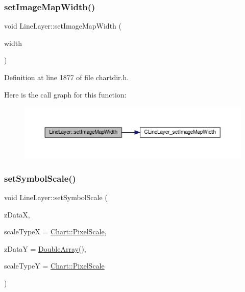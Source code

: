 \subsubsection{\texorpdfstring{set\+Image\+Map\+Width()}{setImageMapWidth()}}
{\footnotesize\ttfamily void Line\+Layer\+::set\+Image\+Map\+Width (\begin{DoxyParamCaption}\item[{int}]{width }\end{DoxyParamCaption})\hspace{0.3cm}{\ttfamily [inline]}}



Definition at line 1877 of file chartdir.\+h.

Here is the call graph for this function\+:
\nopagebreak
\begin{figure}[H]
\begin{center}
\leavevmode
\includegraphics[width=350pt]{class_line_layer_a64657daacc236f5f74b9f91edf70a6bd_cgraph}
\end{center}
\end{figure}
\mbox{\label{class_line_layer_a895f509de10c66189649d10872db77ab}} 
\subsubsection{\texorpdfstring{set\+Symbol\+Scale()}{setSymbolScale()}}
{\footnotesize\ttfamily void Line\+Layer\+::set\+Symbol\+Scale (\begin{DoxyParamCaption}\item[{\hyperlink{class_double_array}{Double\+Array}}]{z\+DataX,  }\item[{int}]{scale\+TypeX = {\ttfamily \hyperlink{namespace_chart_af8005281e1fb57d737e9f89b13605808afebebf69a28e58958dc5f9da3ece2147}{Chart\+::\+Pixel\+Scale}},  }\item[{\hyperlink{class_double_array}{Double\+Array}}]{z\+DataY = {\ttfamily \hyperlink{class_double_array}{Double\+Array}()},  }\item[{int}]{scale\+TypeY = {\ttfamily \hyperlink{namespace_chart_af8005281e1fb57d737e9f89b13605808afebebf69a28e58958dc5f9da3ece2147}{Chart\+::\+Pixel\+Scale}} }\end{DoxyParamCaption})\hspace{0.3cm}{\ttfamily [inline]}}




